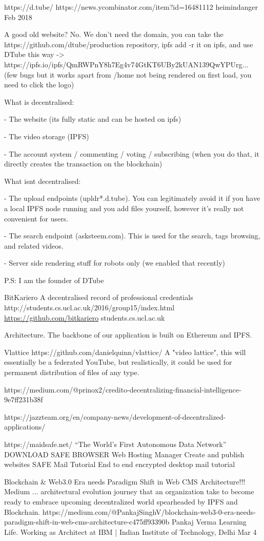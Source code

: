 {
https://d.tube/
https://news.ycombinator.com/item?id=16481112
heimindanger Feb 2018

A good old website? No.
We don't need the domain, you can take the https://github.com/dtube/production repository, ipfs add -r it on ipfs, and use DTube this way -> https://ipfs.io/ipfs/QmRWPnY8h7Eg4v74GtKT6UBy2kUAN139QwYPUrg... (few bugs but it works apart from /home not being rendered on first load, you need to click the logo)

What is decentralised:

- The website (its fully static and can be hosted on ipfs)

- The video storage (IPFS)

- The account system / commenting / voting / subscribing (when you do that, it directly creates the transaction on the blockchain)

What isnt decentralised:

- The upload endpoints (upldr*.d.tube). You can legitimately avoid it if you have a local IPFS node running and you add files yourself, however it's really not convenient for users.

- The search endpoint (asksteem.com). This is used for the search, tags browsing, and related videos.

- Server side rendering stuff for robots only (we enabled that recently)

P.S: I am the founder of DTube
}

{
  BitKariero A decentralised record of professional credentials http://students.cs.ucl.ac.uk/2016/group15/index.html
\url{https://github.com/bitkariero}
students.cs.ucl.ac.uk

Architecture. The backbone of our application is built on Ethereum and
IPFS.
}


{Vlattice https://github.com/danielquinn/vlattice/ A "video lattice",
this will essentially be a federated YouTube, but realistically, it
could be used for permanent distribution of files of any type.
}

https://medium.com/@prinox2/credito-decentralizing-financial-intelligence-9e7ff231b38f

https://jazzteam.org/en/company-news/development-of-decentralized-applications/

https://maidsafe.net/ ``The World's First Autonomous Data Network''
DOWNLOAD SAFE BROWSER
Web Hosting Manager
Create and publish websites
SAFE Mail Tutorial
End to end encrypted desktop mail tutorial

Blockchain & Web3.0 Era needs Paradigm Shift in Web CMS
Architecture!!!  Medium ... architectural evolution journey that an
organization take to become ready to embrace upcoming decentralized
world spearheaded by IPFS and Blockchain.
https://medium.com/@PankajSinghV/blockchain-web3-0-era-needs-paradigm-shift-in-web-cms-architecture-c475ff93390b
Pankaj Verma Learning Life. Working as Architect at IBM | Indian
Institute of Technology, Delhi Mar 4

